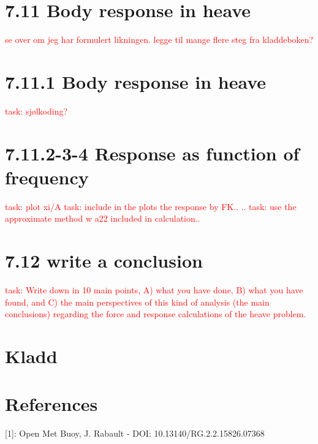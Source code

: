 \documentclass{article}
\begin{document}
\section{7.11 Body response in heave}
%
\textcolor{red}{se over om jeg har formulert likningen. legge til mange flere steg fra kladdeboken?}

\section{7.11.1 Body response in heave}
%
\textcolor{red}{task: sjølkoding?}

\section{7.11.2-3-4 Response as function of frequency}
%
\textcolor{red}{task:  plot xi/A  }
\textcolor{red}{task:  include in the plots the response by FK.. .. }
\textcolor{red}{task:  use the approximate method w a22 included in calculation.. }

\section{7.12 write a conclusion }
%
\textcolor{red}{task: Write down in 10 main points, A) what you have done, B) what you have found, and C) the main perspectives of this kind of analysis (the main conclusions) regarding the force and response calculations of the heave problem. }


\section{Kladd}
%

\section{References}
[1]: Open Met Buoy, J. Rabault - DOI: 10.13140/RG.2.2.15826.07368
\end{document}
